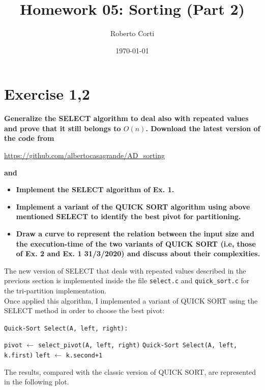 \documentclass{article}
\title{Homework 05: Sorting (Part 2)}
\date{\today}
\author{Roberto Corti}
\begin{document}
	\maketitle
	
	\section*{Exercise 1,2}
	\textbf{Generalize the SELECT algorithm to deal also with repeated values and prove that it still belongs to $O(n)$. Download the latest version of the code from}
	\begin{center}
		\url{https://github.com/albertocasagrande/AD_sorting}
	\end{center}
	\textbf{and} 
	\begin{itemize}
		\item \textbf{Implement the SELECT algorithm of Ex. 1.}
		\item \textbf{Implement a variant of the QUICK SORT algorithm using above mentioned SELECT to identify the best pivot for partitioning.}
		\item \textbf{Draw a curve to represent the relation between the input size and the execution-time of the two variants of QUICK SORT (i.e, those of Ex. 2 and Ex. 1 31/3/2020) and discuss about their complexities.}
	\end{itemize}

	\noindent The new version of SELECT that deals with repeated values described in the previous section is implemented inside the file \texttt{select.c} and \texttt{quick\_sort.c} for the tri-partition implementation.\\
	Once applied this algorithm, I implemented a variant of QUICK SORT using the SELECT method in order to choose the best pivot:
	
		\begin{algorithm}
		\texttt{Quick-Sort Select(A, left, right):} \label{ex2}
		\begin{algorithmic}
			\State \texttt{pivot} $\gets$ \texttt{select\_pivot(A, left, right)}
			\State \texttt{Quick-Sort  Select(A, left, k.first)}
			\State \texttt{left} $\gets$ \texttt{k.second+1}
			\EndWhile
			
		\end{algorithmic}
	\end{algorithm}

	\newpage
	
	\noindent The results, compared with the classic version of QUICK SORT, are represented in the following plot.
	
\end{document}
